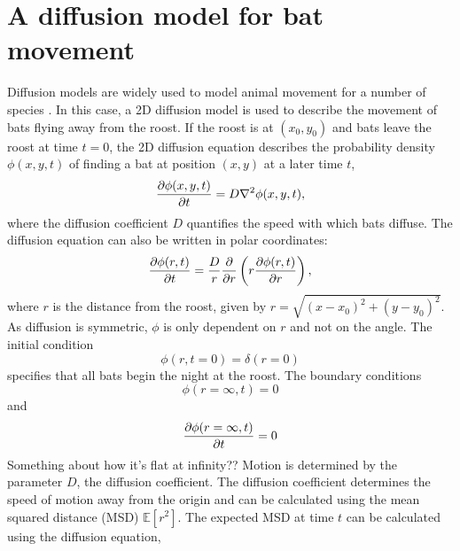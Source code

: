 \section{A diffusion model for bat movement}
%
Diffusion models are widely used to model animal movement for a number of species \cite{Ovaskainen2016}. In this case, a 2D diffusion model is used to describe the movement of bats flying away from the roost.
%
If the roost is at $(x_0,y_0)$ and bats leave the roost at time $t =0$,
the 2D diffusion equation describes the probability density $\phi(x,y,t)$ of
finding a bat at position $(x,y)$ at a later time $t$,
%
\begin{equation}
  \frac{\partial \phi(x,y,t)}{\partial t} = D \nabla^2 \phi(x,y,t) ,
  \label{eqn:diffusion_cartesian}
\end{equation}
%
where the diffusion coefficient $D$ quantifies the speed with which bats diffuse. The diffusion equation can also be written in polar coordinates:
%
\begin{equation}
\frac{\partial  \phi(r,t)}{\partial t} = \frac{D}{r} \frac{\partial }{\partial  r} \left( r \frac{\partial \phi(r,t)}{\partial r} \right),
\label{eqn:diffusion_polar}
\end{equation}
%
where $r$ is the distance from the roost, given by $r=\sqrt{(x-x_0)^2 + (y-y_0)^2}$. As diffusion is symmetric, $\phi$ is only dependent on $r$ and not on the angle.
%
The initial condition
%
\begin{equation}
\phi(r,t=0) = \delta(r=0)
\label{eqn:IC}
\end{equation}
%
specifies that all bats begin the night at the roost. The boundary conditions
%
\begin{equation}
\phi(r=\infty,t) = 0
\label{eqn:IC}
\end{equation}
%
and
%
\begin{equation}
\frac{\partial \phi(r=\infty,t)}{\partial t} = 0
\label{eqn:IC}
\end{equation}
%
{\huge Something about how it's flat at infinity??}
%
Motion is determined by the parameter $D$, the diffusion coefficient. The diffusion coefficient determines the speed of motion away from the origin and can be calculated using the mean squared distance (MSD) $\mathbb{E}[r^2]$. The expected MSD at time $t$ can be calculated using the diffusion equation,

